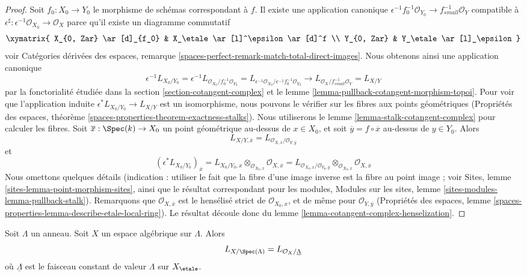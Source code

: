 \begin{proof}
Soit $f_0 : X_0 \to Y_0$ le morphisme de schémas correspondant à $f$. Il
existe une application canonique
$\epsilon^{-1}f_0^{-1}\mathcal{O}_{Y_0} \to f_{small}^{-1}\mathcal{O}_Y$
compatible à
$\epsilon^\sharp : \epsilon^{-1}\mathcal{O}_{X_0} \to \mathcal{O}_X$
parce qu'il existe un diagramme commutatif
$$
\xymatrix{
X_{0, Zar} \ar[d]_{f_0} & X_\etale \ar[l]^\epsilon \ar[d]^f \\
Y_{0, Zar} & Y_\etale \ar[l]_\epsilon
}
$$
voir Catégories dérivées des espaces, remarque
\ref{spaces-perfect-remark-match-total-direct-images}.
Nous obtenons ainsi une application canonique
$$
\epsilon^{-1}L_{X_0/Y_0} =
\epsilon^{-1}L_{\mathcal{O}_{X_0}/f_0^{-1}\mathcal{O}_{Y_0}} =
L_{\epsilon^{-1}\mathcal{O}_{X_0}/\epsilon^{-1}f_0^{-1}\mathcal{O}_{Y_0}}
\longrightarrow
L_{\mathcal{O}_X/f^{-1}_{small}\mathcal{O}_Y} = L_{X/Y}
$$
par la fonctorialité étudiée dans la section
\ref{section-cotangent-complex} et le lemme
\ref{lemma-pullback-cotangent-morphism-topoi}. Pour voir que l'application
induite $\epsilon^*L_{X_0/Y_0} \to L_{X/Y}$ est un isomorphisme, nous pouvons
le vérifier sur les fibres aux points géométriques (Propriétés des espaces,
théorème \ref{spaces-properties-theorem-exactness-stalks}). Nous utiliserons
le lemme \ref{lemma-stalk-cotangent-complex} pour calculer les fibres. Soit
$\overline{x} : \Spec(k) \to X_0$ un point géométrique au-dessus de
$x \in X_0$, et soit $\overline{y} = f \circ \overline{x}$ au-dessus de
$y \in Y_0$. Alors
$$
L_{X/Y, \overline{x}} =
L_{\mathcal{O}_{X, \overline{x}}/\mathcal{O}_{Y, \overline{y}}}
$$
et
$$
(\epsilon^*L_{X_0/Y_0})_{\overline{x}} =
L_{X_0/Y_0, x} \otimes_{\mathcal{O}_{X_0, x}}
\mathcal{O}_{X, \overline{x}} =
L_{\mathcal{O}_{X_0, x}/\mathcal{O}_{Y_0, y}}
\otimes_{\mathcal{O}_{X_0, x}} \mathcal{O}_{X, \overline{x}}
$$
Nous omettons quelques détails (indication : utiliser le fait que la fibre
d'une image inverse est la fibre au point image ; voir Sites, lemme
\ref{sites-lemma-point-morphism-sites}, ainsi que le résultat correspondant
pour les modules, Modules sur les sites, lemme
\ref{sites-modules-lemma-pullback-stalk}). Remarquons que
$\mathcal{O}_{X, \overline{x}}$ est le hensélisé strict de
$\mathcal{O}_{X_0, x}$, et de même pour $\mathcal{O}_{Y, \overline{y}}$
(Propriétés des espaces, lemme
\ref{spaces-properties-lemma-describe-etale-local-ring}). Le résultat découle
donc du lemme \ref{lemma-cotangent-complex-henselization}.
\end{proof}

\begin{lemma}
\label{lemma-space-over-ring}
Soit $\Lambda$ un anneau. Soit $X$ un espace algébrique sur $\Lambda$. Alors
$$
L_{X/\Spec(\Lambda)} = L_{\mathcal{O}_X/\underline{\Lambda}}
$$
où $\underline{\Lambda}$ est le faisceau constant de valeur $\Lambda$ sur
$X_\etale$.
\end{lemma}

